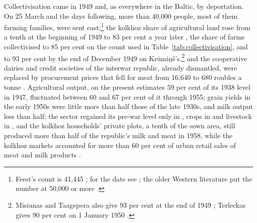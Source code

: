 Collectivisation came in 1949 and, as everywhere in the Baltic, by deportation. On 25 March and the days following, more than 40,000 people, most of them farming families, were sent east;\footnote{Feest's count is 41,445 \parencite[99--100]{feest2014}; for the date see \parencites[172]{strods_2006_nonviolent}[75]{pocius_2019_lietuvos}; the older Western literature put the number at 50,000 or more \parencites[90]{labsvirs_1959_case}[99]{years_of_dependence}.} the kolkhoz share of agricultural land rose from a tenth at the beginning of 1949 to 83 per cent a year later \parencite[94]{labsvirs_1959_case}, the share of farms collectivised to 85 per cent on the count used in Table~\ref{tab:collectivisation}, and to 93 per cent by the end of December 1949 on Krūmiņš's,\footnote{Misiunas and Taagepera also give 93 per cent at the end of 1949 \parencite[102]{years_of_dependence}; Terleckas gives 90 per cent on 1 January 1950 \parencite[225]{terleckas_2026_siferio}.} and the cooperative dairies and credit societies of the interwar republic, already dismantled, were replaced by procurement prices that fell for meat from 16,640 to 680 roubles a tonne \parencites[245--50]{krumins_2017_sovetizacijas}[48]{aizsilnieks_1974_sovietization}. Agricultural output, on the present estimates 59 per cent of its 1938 level in 1947, fluctuated between 60 and 67 per cent of it through 1955; grain yields in the early 1950s were little more than half those of the late 1930s, and milk output less than half; the sector regained its pre-war level only in , crops in  and livestock in , and the kolkhoz households' private plots, a tenth of the sown area, still produced more than half of the republic's milk and meat in 1958, while the kolkhoz markets accounted for more than 60 per cent of urban retail sales of meat and milk products \parencites[219--23, 269--71]{labsvirs_1959_case}[282]{krumins_2017_tautsaimnieciba_1950}.

